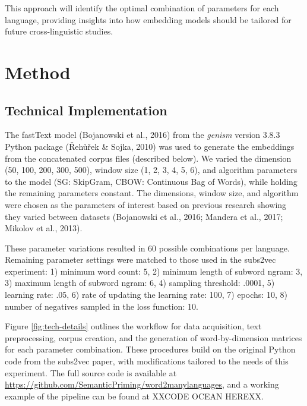 \documentclass[
  man,floatsintext]{apa6}
\begin{document}
This approach will identify the optimal combination of parameters for each language, providing insights into how embedding models should be tailored for future cross-linguistic studies.

\section{Method}\label{method}

\subsection{Technical Implementation}\label{technical-implementation}

The fastText model (Bojanowski et al., 2016) from the \emph{genism} version 3.8.3 Python package (Řehůřek \& Sojka, 2010) was used to generate the embeddings from the concatenated corpus files (described below). We varied the dimension (50, 100, 200, 300, 500), window size (1, 2, 3, 4, 5, 6), and algorithm parameters to the model (SG: SkipGram, CBOW: Continuous Bag of Words), while holding the remaining parameters constant. The dimensions, window size, and algorithm were chosen as the parameters of interest based on previous research showing they varied between datasets (Bojanowski et al., 2016; Mandera et al., 2017; Mikolov et al., 2013).

These parameter variations resulted in 60 possible combinations per language. Remaining parameter settings were matched to those used in the subs2vec experiment: 1) minimum word count: 5, 2) minimum length of subword ngram: 3, 3) maximum length of subword ngram: 6, 4) sampling threshold: .0001, 5) learning rate: .05, 6) rate of updating the learning rate: 100, 7) epochs: 10, 8) number of negatives sampled in the loss function: 10.

Figure \ref{fig:tech-details} outlines the workflow for data acquisition, text preprocessing, corpus creation, and the generation of word-by-dimension matrices for each parameter combination. These procedures build on the original Python code from the subs2vec paper, with modifications tailored to the needs of this experiment. The full source code is available at \url{https://github.com/SemanticPriming/word2manylanguages}, and a working example of the pipeline can be found at XXCODE OCEAN HEREXX.
\end{document}
